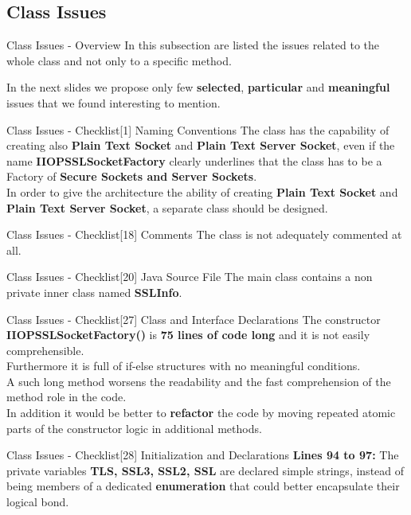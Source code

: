 \documentclass{../common/latex_classes/pdf_presentation}
\newcommand{\renderPartialCode}[2]{
	
}
\begin{document}
	\subsection{Class Issues}
	
	\begin{frame}{Class Issues - Overview}
		In this subsection are listed the issues related to the whole class and not only to a specific method. \par
		In the next slides we propose only few \textbf{selected}, \textbf{particular} and \textbf{meaningful} issues that we found interesting to mention.
	\end{frame}
	\begin{frame}{Class Issues - Checklist[1] Naming Conventions}
		The class has the capability of creating also \textbf{Plain Text Socket} and \textbf{Plain Text Server Socket}, even if the name \textbf{IIOPSSLSocketFactory} clearly underlines that the class has to be a Factory of \textbf{Secure Sockets and Server Sockets}. \\
		In order to give the architecture the ability of creating \textbf{Plain Text Socket} and \textbf{Plain Text Server Socket}, a separate class should be designed.
	\end{frame}
	\begin{frame}{Class Issues - Checklist[18] Comments}
		The class is not adequately commented at all.
	\end{frame}
	\begin{frame}{Class Issues - Checklist[20] Java Source File}
		The main class contains a non private inner class named \textbf{SSLInfo}.
	\end{frame}
	\begin{frame}{Class Issues - Checklist[27] Class and Interface Declarations}
		The constructor \textbf{IIOPSSLSocketFactory()} is \textbf{75 lines of code long} and it is not easily comprehensible.\\
		Furthermore it is full of if-else structures with no meaningful conditions.\\
		A such long method worsens the readability and the fast comprehension of the method role in the code.\\
		In addition it would be better to \textbf{refactor} the code by moving repeated atomic parts of the constructor logic in additional methods.
	\end{frame}
	\begin{frame}{Class Issues - Checklist[28] Initialization and Declarations}
		\textbf{Lines 94 to 97:} The private variables \textbf{TLS, SSL3, SSL2, SSL} are declared simple strings, instead of being members of a dedicated \textbf{enumeration} that could better encapsulate their logical bond.
	\end{frame}
\end{document}
